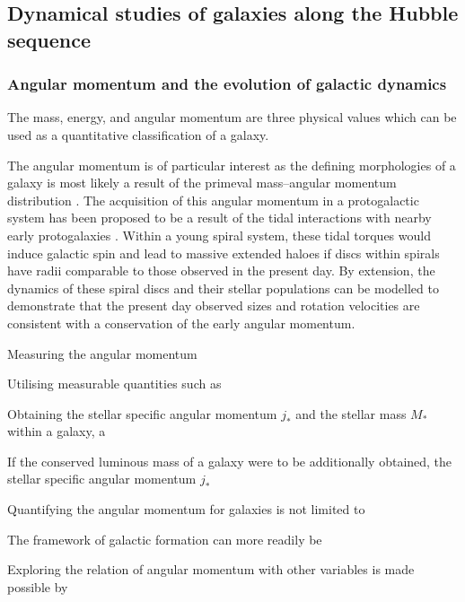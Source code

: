 \documentclass[12pt, twocolumn]{revtex4-1}    %
\begin{document}
\vspace{2ex}
\subsection{Dynamical studies of galaxies along the Hubble sequence}
\subsubsection{Angular momentum and the evolution of galactic dynamics}
\noindent
The mass, energy, and angular momentum are three physical values which can be used as a quantitative classification of a galaxy. 

The angular momentum is of particular interest as the defining morphologies of a galaxy is most likely a result of the primeval mass--angular momentum distribution \citep{1970ApJ...160..831S}. The acquisition of this angular momentum in a protogalactic system has been proposed to be a result of the tidal interactions with nearby early protogalaxies \citep{1969ApJ...155..393P}. Within a young spiral system, these tidal torques would induce galactic spin and lead to massive extended haloes if discs within spirals have radii comparable to those observed in the present day. By extension, the dynamics of these spiral discs and their stellar populations can be modelled \citep{1998MNRAS.295..319M, 1997ApJ...482..659D} to demonstrate that the present day observed sizes and rotation velocities are consistent with a conservation of the early angular momentum. 

Measuring the angular momentum 


Utilising measurable quantities such as 

Obtaining the stellar specific angular momentum $j_*$ and the stellar mass $M_*$ within a galaxy, a 

If the conserved luminous mass of a galaxy were to be additionally obtained, the stellar specific angular momentum $j_*$

Quantifying the angular momentum for galaxies is not limited to 

The framework of galactic formation can more readily be 

Exploring the relation of angular momentum with other variables is made possible by 
\end{document}
